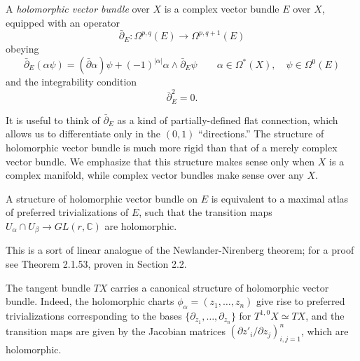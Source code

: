 \documentclass[12pt,letterpaper,reqno]{article}
\numberwithin{equation}{section}
\newcommand{\C}{\ensuremath{\mathbb C}}
\newcommand{\de}{\mathrm{d}}
\newcommand{\abs}[1]{\lvert#1\rvert}
\newcommand{\ti}[1]{\textit{#1}}
\begin{document}
\begin{defn} A \ti{holomorphic vector bundle} over $X$ is a complex vector bundle $E$ over $X$, equipped with an operator
\begin{equation}
  \bar\partial_E :  \Omega^{p,q}(E) \to \Omega^{p,q+1}(E)
\end{equation}
obeying
\begin{equation}
  \bar\partial_E (\alpha \psi) = (\bar\partial \alpha) \psi + (-1)^{\abs{\alpha}} \alpha \wedge \bar\partial_E \psi \qquad \alpha \in \Omega^*(X), \quad \psi \in \Omega^0(E)
\end{equation}
and the integrability condition
\begin{equation}
  \bar\partial_E^2 = 0.
\end{equation}
\end{defn}

It is useful to think of $\bar\partial_E$ as a kind of 
partially-defined flat connection, which allows us to differentiate
only in the $(0,1)$ ``directions.''
The structure of holomorphic vector bundle is much 
more rigid than that of a merely complex vector bundle.
We emphasize that this structure makes sense only when $X$ is 
a complex manifold, while complex vector bundles make sense 
over any $X$.

\begin{prop} A structure of holomorphic vector bundle on $E$ is equivalent to a maximal atlas 
of preferred trivializations of $E$, such that
the transition maps 
$U_\alpha \cap U_\beta \to GL(r,\C)$ 
are holomorphic. 
\end{prop}
\begin{pf}
This is a sort of linear analogue of the 
Newlander-Nirenberg theorem; for a proof see 
\cite{MR1079726} Theorem 2.1.53, proven in Section 2.2.
\end{pf}


\begin{example} The tangent bundle $TX$ carries
a canonical structure of holomorphic vector bundle.
Indeed, the holomorphic charts $\phi_\alpha = (z_1, \dots, z_n)$ 
give rise to preferred trivializations corresponding 
to the bases $\{\partial_{z_1}, \dots, \partial_{z_n} \}$
for $T^{1,0} X \simeq TX$, and the transition 
maps are given by the Jacobian matrices 
$(\partial z'_i / \partial z_j)_{i,j=1}^n$, which are holomorphic.
\end{example}
\end{document}
